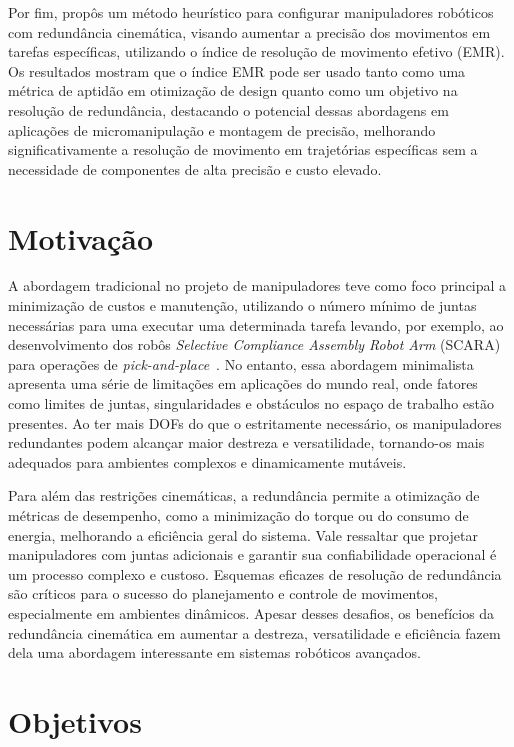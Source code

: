 Por fim, \cite{hammond2011} propôs um método heurístico para configurar manipuladores robóticos com redundância cinemática, visando aumentar a precisão 
dos movimentos em tarefas específicas, utilizando o índice de resolução de movimento efetivo (EMR). Os resultados mostram que o índice EMR pode ser 
usado tanto como uma métrica de aptidão em otimização de design quanto como um objetivo na resolução de redundância,  destacando o potencial dessas
abordagens em aplicações de micromanipulação e montagem de precisão,  melhorando significativamente a resolução de movimento em trajetórias específicas 
sem a necessidade de componentes de alta precisão e custo elevado.

\section{Motivação}\label{sec:motivation}

A abordagem tradicional no projeto de manipuladores teve como foco principal a minimização de custos e manutenção,
utilizando o número mínimo de juntas necessárias para uma executar uma determinada tarefa levando, por exemplo, ao
desenvolvimento dos robôs \emph{Selective Compliance Assembly Robot Arm} (SCARA) para operações de \emph{pick-and-place}~\cite{siciliano_springer_2008}.
No entanto, essa abordagem  minimalista apresenta uma série de limitações em aplicações do mundo real, onde fatores como
limites de juntas, singularidades e obstáculos no espaço de trabalho estão presentes. Ao ter mais DOFs
do que o estritamente necessário, os manipuladores redundantes podem alcançar maior destreza e versatilidade, tornando-os
mais adequados para ambientes complexos e dinamicamente mutáveis.

Para além das restrições cinemáticas, a redundância permite a otimização de métricas de desempenho, como a minimização do torque ou do consumo de energia, melhorando a
eficiência geral do sistema. Vale ressaltar que projetar manipuladores com juntas adicionais e garantir sua confiabilidade operacional é um
processo complexo e custoso. Esquemas eficazes de resolução de redundância são críticos para o sucesso do planejamento e controle de movimentos,
especialmente em ambientes dinâmicos. Apesar desses desafios, os benefícios da redundância cinemática em aumentar a destreza, versatilidade e eficiência
fazem dela uma abordagem interessante em sistemas robóticos avançados.

\section{Objetivos}\label{sec:objectives}

